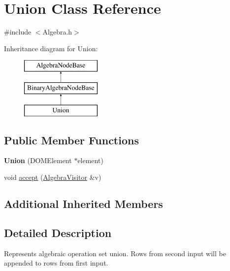 \hypertarget{class_union}{\section{Union Class Reference}
\label{class_union}
}


{\ttfamily \#include $<$Algebra.\+h$>$}

Inheritance diagram for Union\+:\begin{figure}[H]
\begin{center}
\leavevmode
\includegraphics[height=3.000000cm]{class_union}
\end{center}
\end{figure}
\subsection*{Public Member Functions}
\begin{DoxyCompactItemize}
\item 
\hypertarget{class_union_a092a85229eefb0a218bec53bd12b9433}{{\bfseries Union} (D\+O\+M\+Element $\ast$element)}\label{class_union_a092a85229eefb0a218bec53bd12b9433}

\item 
void \hyperlink{class_union_a3a6b25cdee04be26d42e6f531e358e34}{accept} (\hyperlink{class_algebra_visitor}{Algebra\+Visitor} \&v)
\end{DoxyCompactItemize}
\subsection*{Additional Inherited Members}


\subsection{Detailed Description}
Represents algebraic operation set union. Rows from second input will be appended to rows from first input. 

